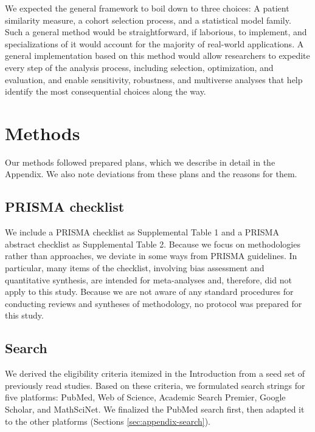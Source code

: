 \documentclass[preprint, 3p,
authoryear]{elsarticle} %
\begin{document}
We expected the general framework to boil down to three choices: A
patient similarity measure, a cohort selection process, and a
statistical model family. Such a general method would be
straightforward, if laborious, to implement, and specializations of it
would account for the majority of real-world applications. A general
implementation based on this method would allow researchers to expedite
every step of the analysis process, including selection, optimization,
and evaluation, and enable sensitivity, robustness, and multiverse
analyses that help identify the most consequential choices along the
way.

\hypertarget{methods}{%
\section{Methods}\label{methods}}

Our methods followed prepared plans, which we describe in detail in the
Appendix. We also note deviations from these plans and the reasons for
them.

\hypertarget{prisma-checklist}{%
\subsection{PRISMA checklist}\label{prisma-checklist}}

We include a PRISMA checklist as Supplemental Table 1 and a PRISMA
abstract checklist as Supplemental Table 2. Because we focus on
methodologies rather than approaches, we deviate in some ways from
PRISMA guidelines. In particular, many items of the checklist, involving
bias assessment and quantitative synthesis, are intended for
meta-analyses and, therefore, did not apply to this study. Because we
are not aware of any standard procedures for conducting reviews and
syntheses of methodology, no protocol was prepared for this study.

\hypertarget{search}{%
\subsection{Search}\label{search}}

We derived the eligibility criteria itemized in the Introduction from a
seed set of previously read studies. Based on these criteria, we
formulated search strings for five platforms: PubMed, Web of Science,
Academic Search Premier, Google Scholar, and MathSciNet. We finalized
the PubMed search first, then adapted it to the other platforms
(Sections \ref{sec:appendix-search}).
\end{document}
